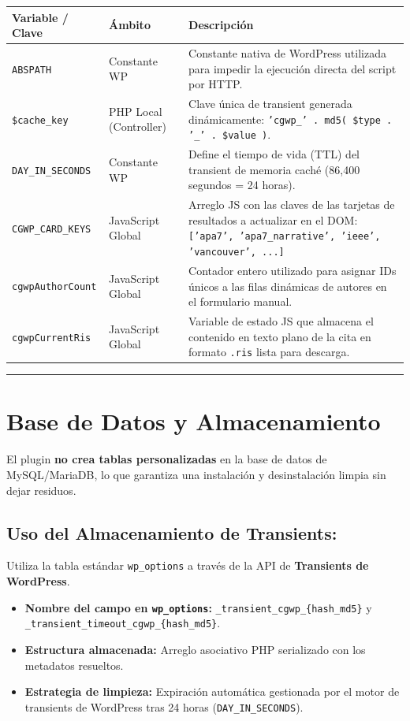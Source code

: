 \documentclass[11pt, a4paper]{article}
\begin{document}
\begin{longtable}{|p{5.3cm}|p{5.3cm}|p{5.3cm}|}
\hline
\textbf{Variable / Clave} & \textbf{Ámbito} & \textbf{Descripción} \\
\hline
\endhead
\texttt{ABSPATH} & Constante WP & Constante nativa de WordPress utilizada para impedir la ejecución directa del script por HTTP. \\
\hline
\texttt{\$cache\_key} & PHP Local (Controller) & Clave única de transient generada dinámicamente: \texttt{'cgwp\_' . md5( \$type . '\_' . \$value )}. \\
\hline
\texttt{DAY\_IN\_SECONDS} & Constante WP & Define el tiempo de vida (TTL) del transient de memoria caché (86,400 segundos = 24 horas). \\
\hline
\texttt{CGWP\_CARD\_KEYS} & JavaScript Global & Arreglo JS con las claves de las tarjetas de resultados a actualizar en el DOM: \texttt{['apa7', 'apa7\_narrative', 'ieee', 'vancouver', ...]} \\
\hline
\texttt{cgwpAuthorCount} & JavaScript Global & Contador entero utilizado para asignar IDs únicos a las filas dinámicas de autores en el formulario manual. \\
\hline
\texttt{cgwpCurrentRis} & JavaScript Global & Variable de estado JS que almacena el contenido en texto plano de la cita en formato \texttt{.ris} lista para descarga. \\
\hline
\end{longtable}


\bigskip\noindent\rule{\textwidth}{0.4pt}\bigskip


\section{Base de Datos y Almacenamiento}

El plugin \textbf{no crea tablas personalizadas} en la base de datos de MySQL/MariaDB, lo que garantiza una instalación y desinstalación limpia sin dejar residuos.


\subsection{Uso del Almacenamiento de Transients:}
Utiliza la tabla estándar \texttt{wp\_options} a través de la API de \textbf{Transients de WordPress}.


\begin{itemize}
\item \textbf{Nombre del campo en \texttt{wp\_options}:} \texttt{\_transient\_cgwp\_\{hash\_md5\}} y \texttt{\_transient\_timeout\_cgwp\_\{hash\_md5\}}.
\item \textbf{Estructura almacenada:} Arreglo asociativo PHP serializado con los metadatos resueltos.
\item \textbf{Estrategia de limpieza:} Expiración automática gestionada por el motor de transients de WordPress tras 24 horas (\texttt{DAY\_IN\_SECONDS}).
\end{itemize}
\end{document}
